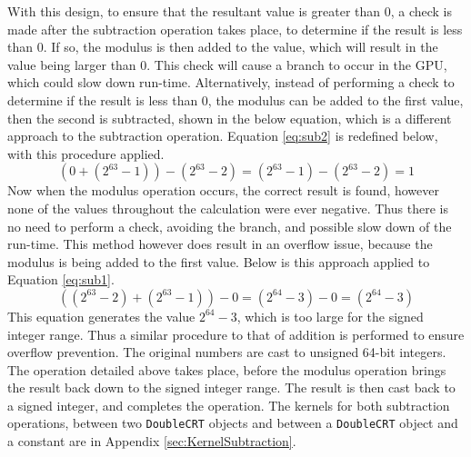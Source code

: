 With this design, to ensure that the resultant value is greater than 0, a check is made after the subtraction operation takes place, to determine if the result is less than 0. If so, the modulus is then added to the value, which will result in the value being larger than 0. This check will cause a branch to occur in the GPU, which could slow down run-time. Alternatively, instead of performing a check to determine if the result is less than 0, the modulus can be added to the first value, then the second is subtracted, shown in the below equation, which is a different approach to the subtraction operation. Equation \ref{eq:sub2} is redefined below, with this procedure applied. 
\begin{equation}
(0 + (2^{63} - 1)) - (2^{63} - 2) = (2^{63} - 1) - (2^{63} - 2) = 1
\end{equation}
Now when the modulus operation occurs, the correct result is found, however none of the values throughout the calculation were ever negative. Thus there is no need to perform a check, avoiding the branch, and possible slow down of the run-time. This method however does result in an overflow issue, because the modulus is being added to the first value. Below is this approach applied to Equation \ref{eq:sub1}.
\begin{equation}
((2^{63} - 2) + (2^{63} - 1)) - 0 = (2^{64} - 3) - 0 = (2^{64} - 3)
\end{equation}
This equation generates the value $2^{64} - 3$, which is too large for the signed integer range. Thus a similar procedure to that of addition is performed to ensure overflow prevention. The original numbers are cast to unsigned 64-bit integers. The operation detailed above takes place, before the modulus operation brings the result back down to the signed integer range. The result is then cast back to a signed integer, and completes the operation. The kernels for both subtraction operations, between two \verb|DoubleCRT| objects and between a \verb|DoubleCRT| object and a constant are in Appendix \ref{sec:KernelSubtraction}.

